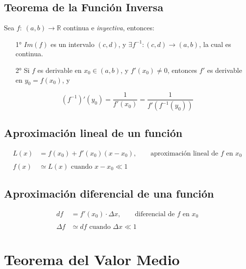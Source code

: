 \documentclass[11pt,titlepage]{article}
\begin{document}
\subsection{Teorema de la Función Inversa}
Sea $f: \ (a,b) \to \mathbb{R}$ continua e \emph{inyectiva}, entonces:
\begin{itemize}
	\item[1°] $Im(f)$ es un intervalo $(c,d)$, y $\exists f^{-1}: (c,d) \to (a,b)$, la cual es continua.
	\item[2°] Si $f$ es derivable en $x_0 \in (a,b)$, y $f'(x_0) \neq 0$, entonces $f'$ es derivable en $y_0 = f(x_0)$, y  
\end{itemize}
\begin{equation}
	\left(f^{-1}\right)'(y_0) = \frac{1}{f'(x_0)} = \frac{1}{f'\left(f^{-1}(y_0)\right)}
\end{equation}

\subsection{Aproximación lineal de un función}
\begin{equation}
	\begin{aligned}
		L(x) &= f(x_0) + f'(x_0)(x - x_0), \qquad \text{aproximación lineal de $f$ en $x_0$} \\ \\
		f(x) &\simeq L(x) \text{ cuando } x - x_0 \ll 1
	\end{aligned}
\end{equation}

\subsection{Aproximación diferencial de una función}
\begin{equation}
	\begin{aligned}
		df &= f'(x_0) \cdot \Delta x, \qquad \text{diferencial de $f$ en $x_0$} \\ \\
		\Delta f &\simeq df \text{ cuando } \Delta x \ll 1
	\end{aligned}
\end{equation}

\vspace{1.5cm}
\section{Teorema del Valor Medio}
\end{document}
